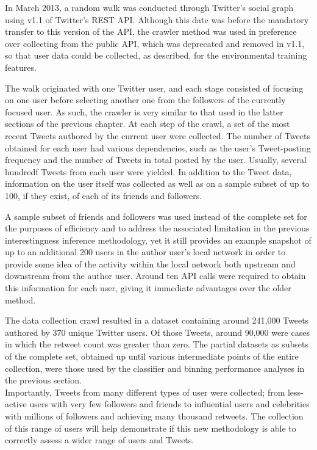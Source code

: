 In March 2013, a random walk was conducted through Twitter's social graph using v1.1 of Twitter's REST API. Although this date was before the mandatory transfer to this version of the API, the crawler method was used in preference over collecting from the public API, which was deprecated and removed in v1.1, so that user data could be collected, as described, for the environmental training features.

The walk originated with one Twitter user, and each stage consisted of focusing on one user before selecting another one from the followers of the currently focused user. As such, the crawler is very similar to that used in the latter sections of the previous chapter. At each step of the crawl, a set of the most recent Tweets authored by the current user were collected. The number of Tweets obtained for each user had various dependencies, such as the user's Tweet-posting frequency and the number of Tweets in total posted by the user. Usually, several hundredf Tweets from each user were yielded. In addition to the Tweet data, information on the user itself was collected as well as on a sample subset of up to 100, if they exist, of each of its friends and followers.

A sample subset of friends and followers was used instead of the complete set for the purposes of efficiency and to address the associated limitation in the previous interestingness inference methodology, yet it still provides an example snapshot of up to an additional 200 users in the author user's local network in order to provide some idea of the activity within the local network both upstream and downstream from the author user. Around ten API calls were required to obtain this information for each user, giving it immediate advantages over the older method. 

The data collection crawl resulted in a dataset containing around 241,000 Tweets authored by 370 unique Twitter users. Of those Tweets, around 90,000 were cases in which the retweet count was greater than zero. The partial datasets as subsets of the complete set, obtained up until various intermediate points of the entire collection, were those used by the classifier and binning performance analyses in the previous section.\\
Importantly, Tweets from many different types of user were collected; from less-active users with very few followers and friends to influential users and celebrities with millions of followers and achieving many thousand retweets. The collection of this range of users will help demonstrate if this new methodology is able to correctly assess a wider range of users and Tweets.


